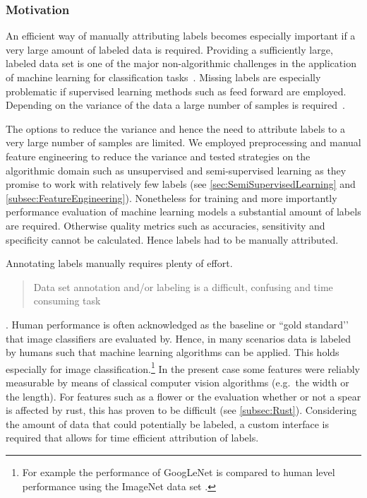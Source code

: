 \subsubsection{Motivation}
\label{subsec:Motivation}

An efficient way of manually attributing labels becomes especially important if a very large amount of labeled data is required. Providing a sufficiently large, labeled data set is one of the major non-algorithmic challenges in the application of machine learning for classification tasks~\citep{al2018labeling}. Missing labels are especially problematic if supervised learning methods such as feed forward  are employed. Depending on the variance of the data a large number of samples is required~\citep{russakovsky2015imagenet}.

\bigskip
The options to reduce the variance and hence the need to attribute labels to a very large number of samples are limited. We employed preprocessing and manual feature engineering to reduce the variance and tested strategies on the algorithmic domain such as unsupervised and semi-supervised learning as they promise to work with relatively few labels (see \autoref{sec:SemiSupervisedLearning} and  \autoref{subsec:FeatureEngineering}). Nonetheless for training and more importantly performance evaluation of machine learning models a substantial amount of labels are required. Otherwise quality metrics such as accuracies, sensitivity and specificity cannot be calculated. Hence labels had to be manually attributed.

Annotating labels manually requires plenty of effort. \blockquote{Data set annotation and/or labeling is a difficult, confusing and time consuming task} \citep[p.~2]{al2018labeling}. Human performance is often acknowledged as the baseline or ``gold standard’’ that image classifiers are evaluated by. Hence, in many scenarios data is labeled by humans such that machine learning algorithms can be applied. This holds especially for image classification.\footnote{For example the performance of GoogLeNet is compared to human level performance using the ImageNet data set \citep{russakovsky2015imagenet}.} In the present case some features were reliably measurable by means of classical computer vision algorithms (e.g.\ the width or the length). For features such as a flower or the evaluation whether or not a spear is affected by rust, this has proven to be difficult (see \autoref{subsec:Rust}). Considering the amount of data that could potentially be labeled, a custom interface is required that allows for time efficient attribution of labels.

